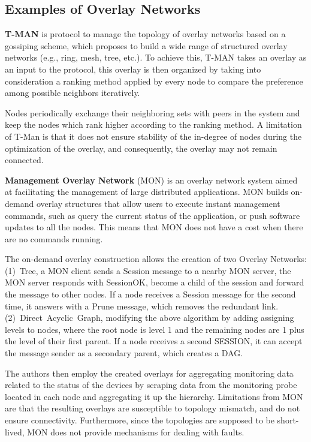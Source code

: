 \subsection{Examples of Overlay Networks}

\textbf{T-MAN} \cite{jelasity2005t} is protocol to manage the topology of overlay networks based on a gossiping scheme, which proposes to build a wide range of structured overlay networks (e.g., ring, mesh, tree, etc.). To achieve this, T-MAN takes an overlay as an input to the protocol, this overlay is then organized by taking into consideration a ranking method applied by every node to compare the preference among possible neighbors iteratively. 

Nodes periodically exchange their neighboring sets with peers in the system and keep the nodes which rank higher according to the ranking method. A limitation of T-Man is that it does not ensure stability of the in-degree of nodes during the optimization of the overlay, and consequently, the overlay may not remain connected. 

\textbf{Management Overlay Network} \cite{liang2005mon} (MON) is an overlay network system aimed at facilitating the management of large distributed applications.
MON builds on-demand overlay structures that allow users to execute instant management commands, such as query the current status of the application, or push software updates to all the nodes. This means that MON does not have a cost when there are no commands running.

The on-demand overlay construction allows the creation of two Overlay Networks: (1)~Tree, a MON client sends a Session message to a nearby MON server, the MON server responds with SessionOK, become a child of the session and forward the message to other nodes. If a node receives a Session message for the second time, it answers with a Prune message, which removes the redundant link. (2)~Direct~Acyclic~Graph, modifying the above algorithm by adding assigning levels to nodes, where the root node is level 1 and the remaining nodes are 1 plus the level of their first parent. If a node receives a second SESSION, it can accept the message sender as a secondary parent, which creates a DAG. 

The authors then employ the created overlays for aggregating monitoring data related to the status of the devices by scraping data from the monitoring probe located in each node and aggregating it up the hierarchy. Limitations from MON are that the resulting overlays are susceptible to topology mismatch, and do not ensure connectivity. Furthermore, since the topologies are supposed to be short-lived, MON does not provide mechanisms for dealing with faults.

